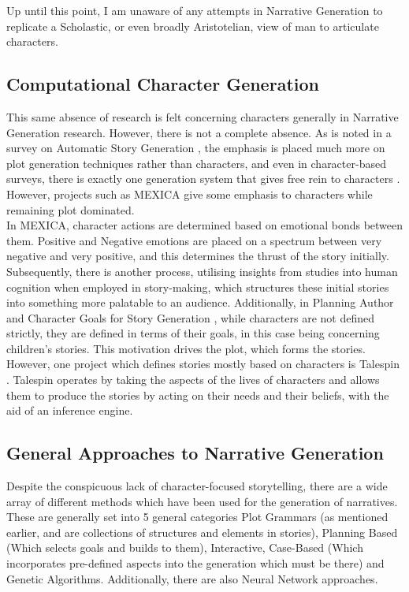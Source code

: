 \documentclass[11pt]{article}
\begin{document}
Up until this point, I am unaware of any attempts in Narrative Generation to replicate a Scholastic, or even broadly Aristotelian, view of man to articulate characters.


\subsection{Computational Character Generation}
This same absence of research is felt concerning characters generally in Narrative Generation research. However, there is not a complete absence. As is noted in a survey on Automatic Story Generation \cite{AutomaticStoryGeneration2021}, the emphasis is placed much more on plot generation techniques rather than characters, and even in character-based surveys, there is exactly one generation system that gives free rein to characters \cite{Riedl2003CharacterfocusedNP}. However, projects such as MEXICA\cite{MEXICA} give some emphasis to characters while remaining plot dominated.\\

In MEXICA, character actions are determined based on emotional bonds between them. Positive and Negative emotions are placed on a spectrum between very negative and very positive, and this determines the thrust of the story initially. Subsequently, there is another process, utilising insights from studies into human cognition when employed in story-making, which structures these initial stories into something more palatable to an audience. Additionally, in Planning Author and Character Goals for Story Generation \cite{authorandcharactergoals}, while characters are not defined strictly, they are defined in terms of their goals, in this case being concerning children's stories. This motivation drives the plot, which forms the stories. However, one project which defines stories mostly based on characters is Talespin \cite{Meehan1977TALESPINAI}. Talespin operates by taking the aspects of the lives of characters and allows them to produce the stories by acting on their needs and their beliefs, with the aid of an inference engine.\\  
\subsection{General Approaches to Narrative Generation}
Despite the conspicuous lack of character-focused storytelling, there are a wide array of different methods which have been used for the generation of narratives. These are generally set into 5 general categories \cite{KybartasGenerationTechniques} \: Plot Grammars (as mentioned earlier, and are collections of structures and elements in stories), Planning Based (Which selects goals and builds to them), Interactive, Case-Based (Which incorporates pre-defined aspects into the generation which must be there) and Genetic Algorithms. Additionally, there are also Neural Network approaches. 
\end{document}
